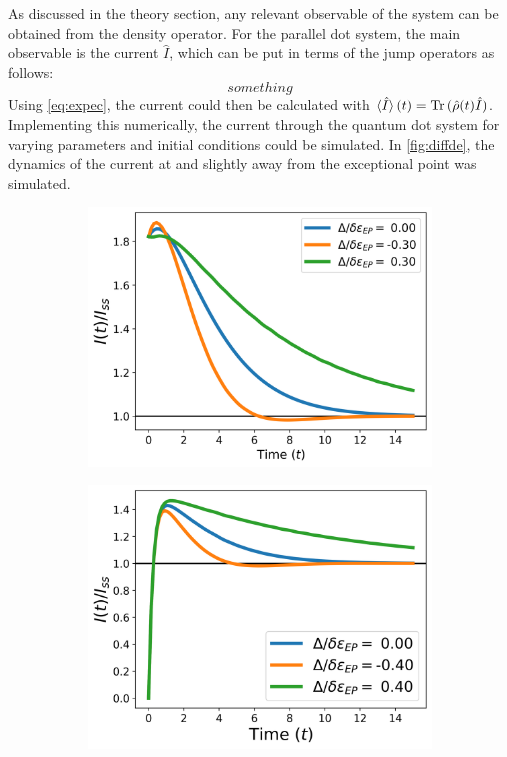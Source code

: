 \documentclass[../main.tex]{subfiles}
\begin{document}
As discussed in the theory section, any relevant observable of the system can be obtained from the density operator. For the parallel dot system, the main observable is the current $\hat I$, which can be put in terms of the jump operators as follows: 
\begin{equation}
    something
\end{equation}
Using \cref{eq:expec}, the current could then be calculated with $\braket{\hat I}(t) = \operatorname{Tr}{(\hat \rho(t)\hat I)}$. Implementing this numerically, the current through the quantum dot system for varying parameters and initial conditions could be simulated. In \cref{fig:diffde}, the dynamics of the current at and slightly away from the exceptional point was simulated.

\begin{figure}[H]
\centering
\begin{subfigure}[t]{.5\textwidth}
  \centering
  \includegraphics[width=\linewidth]{figures/curr_diff_de.png}
  \caption{}
  \label{fig:diffde1}
\end{subfigure}%
\begin{subfigure}[t]{.5\textwidth}
  \centering
  \includegraphics[width=\linewidth]{figures/curr_diff_dev2.png}

\end{subfigure}
\end{figure}
\end{document}
